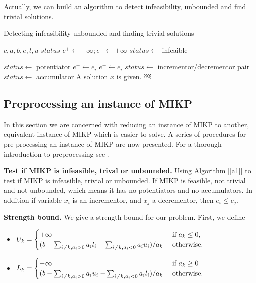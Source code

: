 \documentclass[a4paper,11pt]{article}
\begin{document}
Actually, we can build an algorithm to detect infeasibility, unbounded and find trivial solutions.
\begin{algorithm}
\caption{Detecting infeasibility unbounded and finding trivial solutions}
\label{a1}
\begin{algorithmic}[1] 
\REQUIRE $c,a,b,e,l,u$
\ENSURE $status$
\STATE $e^+ \leftarrow -\infty; e^- \leftarrow +\infty$
			  \STATE $status \leftarrow$ infeaible
		\ENDIF
		
			  \STATE $status \leftarrow$ potentiator
			  \RETURN
			  \STATE $e^+ \leftarrow e_i$
			  \STATE $e^- \leftarrow e_i$
	    \ENDIF
\ENDFOR
{}
		\STATE $status\leftarrow$ incrementor/decrementor pair
		\RETURN
{}
	\STATE $status\leftarrow$ accumulator
	\STATE A solution $x$ is given.
\ENDIF
\RETURN
￼
\end{algorithmic} 
\end{algorithm}

\subsection{Preprocessing an instance of MIKP}

In this section we are concerned with reducing an instance of MIKP to another, equivalent instance of MIKP which is easier to solve. A series of procedures for pre-processing an instance of MIKP are now presented. For a thorough introduction to preprocessing see \cite{savelsbergh1994preprocessing}.

\textbf{Test if MIKP is infeasible, trival or unbounded.}  Using Algorithm [\ref{a1}] to test if MIKP is infeasible, trivial or unbounded.  If MIKP is feasible, not trivial and not unbounded, which means it has no potentiators and no accumulators. In addition if variable $x_i$ is an incrementor, and $x_j$ a decrementor, then $e_i ≤ e_j$.

\textbf{Strength bound.} We give a strength bound for our problem. First, we define
\begin{itemize}
\item $U_k=\begin{cases}
+\infty & ~\mbox{if}~ a_k\leq 0,\\
(b-\sum_{i\neq k, a_i>0}a_il_i-\sum_{i\neq k, a_i<0}a_iu_i)/ a_k &~\mbox{otherwise.}~
\end{cases}$
\item $L_k=\begin{cases}
-\infty & ~\mbox{if}~ a_k\geq 0\\
(b-\sum_{i\neq k, a_i>0}a_iu_i-\sum_{i\neq k, a_i<0}a_il_i)/ a_k &~\mbox{otherwise.}~
\end{cases}$
\end{itemize}
\end{document}
